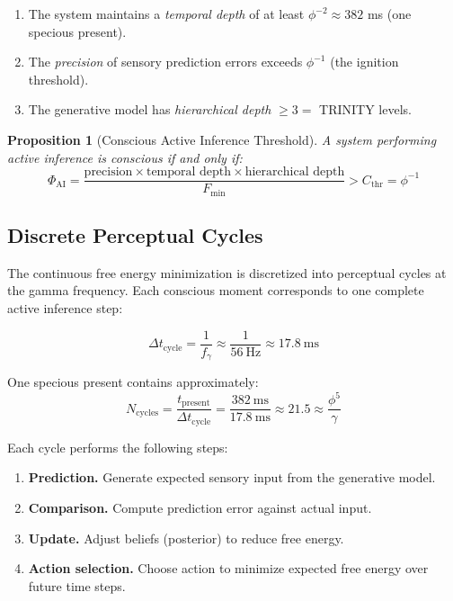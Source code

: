 \documentclass[12pt,a4paper]{article}
\newtheorem{proposition}[theorem]{Proposition}
\begin{document}
\begin{enumerate}[leftmargin=2em]
  \item The system maintains a \emph{temporal depth} of at least $\phi^{-2}
    \approx 382$ ms (one specious present).
  \item The \emph{precision} of sensory prediction errors exceeds $\phi^{-1}$
    (the ignition threshold).
  \item The generative model has \emph{hierarchical depth} $\geq 3 = $ TRINITY
    levels.
\end{enumerate}

\begin{proposition}[Conscious Active Inference Threshold]
A system performing active inference is conscious if and only if:
\begin{equation}
\Phi_{\mathrm{AI}} = \frac{\text{precision} \times \text{temporal depth}
\times \text{hierarchical depth}}{F_{\min}} > C_{\mathrm{thr}} = \phi^{-1}
\end{equation}
\end{proposition}

\subsection{Discrete Perceptual Cycles}

The continuous free energy minimization is discretized into perceptual cycles
at the gamma frequency. Each conscious moment corresponds to one complete
active inference step:

\begin{equation}
\Delta t_{\mathrm{cycle}} = \frac{1}{f_\gamma} \approx \frac{1}{56~\text{Hz}}
\approx 17.8~\text{ms}
\end{equation}

\noindent
One specious present contains approximately:
\begin{equation}
N_{\mathrm{cycles}} = \frac{t_{\mathrm{present}}}{\Delta t_{\mathrm{cycle}}}
= \frac{382~\text{ms}}{17.8~\text{ms}} \approx 21.5 \approx \frac{\phi^5}{\gamma}
\end{equation}

\noindent
Each cycle performs the following steps:
\begin{enumerate}[leftmargin=2em]
  \item \textbf{Prediction.} Generate expected sensory input from the
    generative model.
  \item \textbf{Comparison.} Compute prediction error against actual input.
  \item \textbf{Update.} Adjust beliefs (posterior) to reduce free energy.
  \item \textbf{Action selection.} Choose action to minimize expected free
    energy over future time steps.
\end{enumerate}
\end{document}
